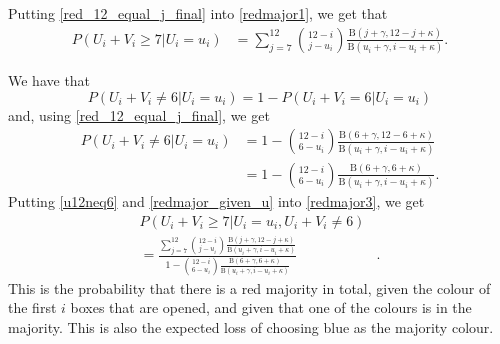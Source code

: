 Putting \eqref{red_12_equal_j_final} into \eqref{redmajor1}, we get that
\begin{equation}
\label{redmajor_given_u}
    \begin{aligned}
        P(U_i+V_i \geq 7 | U_i=u_i) 
        &= \sum_{j=7}^{12} \binom{12-i}{j-u_i} \frac{\text{B}(j+\gamma,12-j+\kappa)}{\text{B}(u_i+\gamma,i-u_i+\kappa)}.
    \end{aligned}
\end{equation}

We have that
\begin{equation*}
    P(U_i+V_i\neq6|U_i=u_i) 
        = 1-P(U_i+V_i=6|U_i=u_i)
\end{equation*}
and, using \eqref{red_12_equal_j_final}, we get 
\begin{equation}
\label{u12neq6}
    \begin{aligned}
        P(U_i+V_i\neq6|U_i=u_i) 
        &= 1-\binom{12-i}{6-u_i} \frac{\text{B}(6+\gamma,12-6+\kappa)}{\text{B}(u_i+\gamma,i-u_i+\kappa)}\\[6pt]
        &= 1-\binom{12-i}{6-u_i} \frac{\text{B}(6+\gamma,6+\kappa)}{\text{B}(u_i+\gamma,i-u_i+\kappa)}.
    \end{aligned}
\end{equation}
Putting \eqref{u12neq6} and \eqref{redmajor_given_u} into \eqref{redmajor3}, we get
\begin{equation}
\label{redmajor_final}
    \begin{aligned}
        P(U_i+V_i \geq 7 | U_i=u_i,U_i+V_i \neq 6)& \\[6pt]
        = \frac{\sum_{j=7}^{12} \binom{12-i}{j-u_i} \frac{\text{B}(j+\gamma,12-j+\kappa)}{\text{B}(u_i+\gamma,i-u_i+\kappa)}}{1-\binom{12-i}{6-u_i} \frac{\text{B}(6+\gamma,6+\kappa)}{\text{B}(u_i+\gamma,i-u_i+\kappa)}}&.
    \end{aligned}
\end{equation}
This is the probability that there is a red majority in total, given the colour of the first $i$ boxes that are opened, and given that one of the colours is in the majority. This is also the expected loss of choosing blue as the majority colour. 


